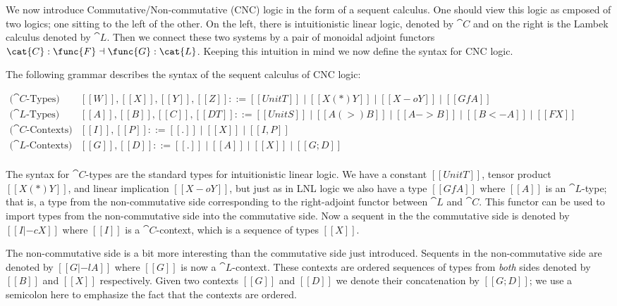 We now introduce Commutative/Non-commutative (CNC) logic in the form of a
sequent calculus. One should view this logic as cmposed of two logics; one
sitting to the left of the other. On the left, there is intuitionistic
linear logic, denoted by $\cat{C}$ and on the right is the Lambek calculus
denoted by $\cat{L}$. Then we connect these two systems by a pair of
monoidal adjoint functors $\cat{C} : \func{F} \dashv \func{G} : \cat{L}$.
Keeping this intuition in mind we now define the syntax for CNC logic.

\begin{definition}
  \label{def:Lambek-syntax}
  The following grammar describes the syntax of the sequent calculus of
  CNC logic:
  \begin{center}\vspace{-3px}\small
    \begin{math}
      \begin{array}{lll}
        \text{($\cat{C}$-Types)} & [[W]],[[X]],[[Y]],[[Z]] ::= [[UnitT]] \mid [[X (*) Y]] \mid [[X -o Y]] \mid [[Gf A]]\\
        \text{($\cat{L}$-Types)} & [[A]],[[B]],[[C]],[[DT]] ::= [[UnitS]] \mid [[A (>) B]] \mid [[A -> B]] \mid [[B <- A]] \mid [[F X]]\\
        \text{($\cat{C}$-Contexts)} & [[I]],[[P]] ::= [[.]] \mid [[X]] \mid [[I,P]]\\
        \text{($\cat{L}$-Contexts)} & [[G]],[[D]] ::= [[.]] \mid [[A]] \mid [[X]] \mid [[G;D]]\\
      \end{array}
    \end{math}
  \end{center}
\end{definition}

The syntax for $\cat{C}$-types are the standard types for intuitionistic
linear logic. We have a constant $[[UnitT]]$, tensor product $[[X (*) Y]]$,
and linear implication $[[X -o Y]]$, but just as in LNL logic we also have a
type $[[Gf A]]$ where $[[A]]$ is an $\cat{L}$-type; that is, a type from the
non-commutative side corresponding to the right-adjoint functor between
$\cat{L}$ and $\cat{C}$. This functor can be used to import types from the
non-commutative side into the commutative side. Now a sequent in the the
commutative side is denoted by $[[I |-c X]]$ where $[[I]]$ is a
$\cat{C}$-context, which is a sequence of types $[[X]]$.

The non-commutative side is a bit more interesting than the commutative side
just introduced. Sequents in the non-commutative side are denoted by
$[[G |-l A]]$ where $[[G]]$ is now a $\cat{L}$-context. These contexts are
ordered sequences of types from \emph{both} sides denoted by $[[B]]$ and
$[[X]]$ respectively. Given two contexts $[[G]]$ and $[[D]]$ we denote their
concatenation by $[[G;D]]$; we use a semicolon here to emphasize the fact
that the contexts are ordered.

